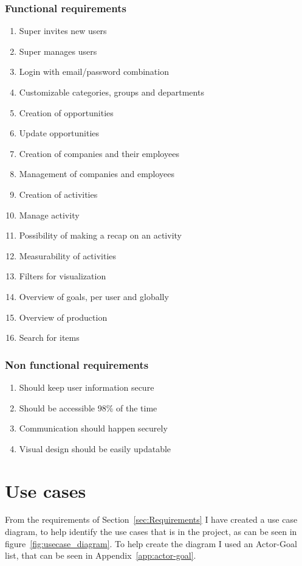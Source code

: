 \subsubsection{Functional requirements}
\label{subs:Functional requirements}
\begin{enumerate}[label=\textbf{F\arabic*}]
  \item Super invites new users
  \item Super manages users
  \item Login with email/password combination
  \item Customizable categories, groups and departments
  \item Creation of opportunities
  \item Update opportunities
  \item Creation of companies and their employees
  \item Management of companies and employees
  \item Creation of activities
  \item Manage activity
  \item Possibility of making a recap on an activity
  \item Measurability of activities
  \item Filters for visualization
  \item Overview of goals, per user and globally
  \item Overview of production
  \item Search for items
\end{enumerate}

\subsubsection{Non functional requirements}
\label{subs:Non functional requirements}
\begin{enumerate}[label=\textbf{NF\arabic*}]
  \item Should keep user information secure
  \item Should be accessible 98\% of the time
  \item Communication should happen securely
  \item Visual design should be easily updatable
\end{enumerate}


\section{Use cases}
\label{sec:Use cases}
From the requirements of Section~\ref{sec:Requirements} I have created a use
case diagram, to help identify the use cases that is in the project, as can be
seen in figure~\ref{fig:usecase_diagram}. To help create the diagram I used an
Actor-Goal list, that can be seen in Appendix~\ref{app:actor-goal}. 

